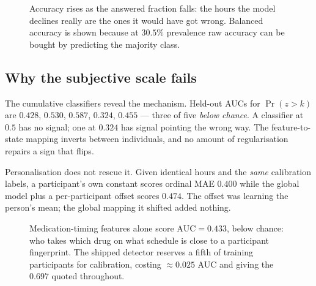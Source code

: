 \documentclass[11pt,a4paper]{article}
\begin{document}
\begin{figure}[h]
\centering
{}
\caption{Accuracy rises as the answered fraction falls: the hours the model
declines really are the ones it would have got wrong. Balanced accuracy is
shown because at $30.5\%$ prevalence raw accuracy can be bought by predicting
the majority class.}
\end{figure}

\subsection{Why the subjective scale fails}

The cumulative classifiers reveal the mechanism. Held-out AUCs for $\Pr(z>k)$
are $0.428$, $0.530$, $0.587$, $0.324$, $0.455$ --- three of five \emph{below
chance}. A classifier at $0.5$ has no signal; one at $0.324$ has signal
pointing the wrong way. The feature-to-state mapping inverts between
individuals, and no amount of regularisation repairs a sign that flips.

Personalisation does not rescue it. Given identical hours and the \emph{same}
calibration labels, a participant's own constant scores ordinal MAE $0.400$
while the global model plus a per-participant offset scores $0.474$. The offset
was learning the person's mean; the global mapping it shifted added nothing.

\begin{figure}[h]
\centering
{}
\caption{Medication-timing features alone score $\mathrm{AUC}=0.433$, below
chance: who takes which drug on what schedule is close to a participant
fingerprint. The shipped detector reserves a fifth of training participants for
calibration, costing $\approx 0.025$ AUC and giving the $0.697$ quoted
throughout.}
\end{figure}
\end{document}
